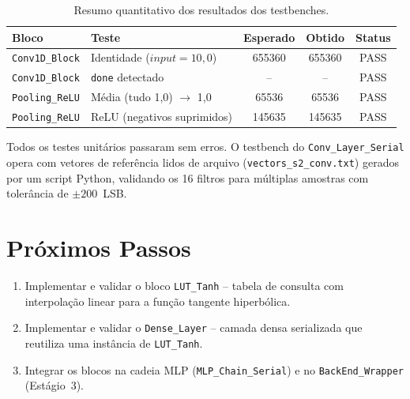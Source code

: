 \documentclass[a4paper,12pt]{article}
\begin{document}
\begin{table}[H]
\centering
\caption{Resumo quantitativo dos resultados dos testbenches.}
\small
\begin{tabular}{llccc}
\hline
\textbf{Bloco} & \textbf{Teste} & \textbf{Esperado} & \textbf{Obtido} & \textbf{Status} \\
\hline
\texttt{Conv1D\_Block}      & Identidade ($input=10{,}0$)        & 655360  & 655360  & PASS \\
\texttt{Conv1D\_Block}      & \texttt{done} detectado            & --      & --      & PASS \\
\texttt{Pooling\_ReLU}      & M\'edia (tudo 1{,}0) $\to$ 1{,}0  & 65536   & 65536   & PASS \\
\texttt{Pooling\_ReLU}      & ReLU (negativos suprimidos)        & 145635  & 145635  & PASS \\
\hline
\end{tabular}
\end{table}

Todos os testes unit\'arios passaram sem erros. O testbench do \texttt{Conv\_Layer\_Serial} opera com vetores de refer\^encia lidos de arquivo (\texttt{vectors\_s2\_conv.txt}) gerados por um script Python, validando os 16 filtros para m\'ultiplas amostras com toler\^ancia de $\pm 200$~LSB.


\section{Pr\'oximos Passos}

\begin{enumerate}
    \item Implementar e validar o bloco \texttt{LUT\_Tanh} -- tabela de consulta com interpola\c{c}\~ao linear para a fun\c{c}\~ao tangente hiperb\'olica.
    \item Implementar e validar o \texttt{Dense\_Layer} -- camada densa serializada que reutiliza uma inst\^ancia de \texttt{LUT\_Tanh}.
    \item Integrar os blocos na cadeia MLP (\texttt{MLP\_Chain\_Serial}) e no \texttt{BackEnd\_Wrapper} (Est\'agio~3).
\end{enumerate}
\end{document}
